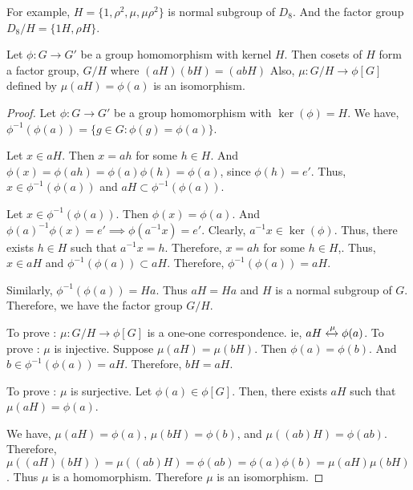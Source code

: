 \begin{remark}
	For example, $H = \{ 1,\rho^2,\mu,\mu\rho^2 \}$ is normal subgroup of $D_8$.
	And the factor group $D_8/H = \{ 1H,\rho H \}$.
\end{remark}

\begin{theorem}
	Let $\phi : G \to G'$ be a group homomorphism with kernel $H$.
	Then cosets of $H$ form a factor group, $G/H$ where $(aH)(bH) = (abH)$ Also, $\mu : G/H \to \phi[G]$ defined by $\mu(aH) = \phi(a)$ is an isomorphism.
\end{theorem}
\begin{proof}
	Let $\phi : G \to G'$ be a group homomorphism with $\ker(\phi) = H$.
	We have, $\phi^{-1}(\phi(a)) = \{ g \in G : \phi(g) = \phi(a) \}$.

	Let $x \in aH$.
	Then $x = ah$ for some $h \in H$.
	And $\phi(x) = \phi(ah) = \phi(a)\phi(h) = \phi(a)$, since $\phi(h) = e'$.
	Thus, $x \in \phi^{-1}(\phi(a))$ and $aH \subset \phi^{-1}(\phi(a))$.

	Let $x \in \phi^{-1}(\phi(a))$.
	Then $\phi(x) = \phi(a)$.
	And $\phi(a)^{-1} \phi(x) = e' \implies \phi(a^{-1}x) = e'$.
	Clearly, $a^{-1}x \in \ker(\phi)$.
	Thus, there exists $h \in H$ such that $a^{-1}x = h$.
	Therefore, $x = ah$ for some $h \in H$,.
	Thus, $x \in aH$ and $\phi^{-1}(\phi(a)) \subset aH$.
	Therefore, $\phi^{-1}(\phi(a)) = aH$.
	
	Similarly, $\phi^{-1}(\phi(a)) = Ha$.
	Thus $aH = Ha$ and $H$ is a normal subgroup of $G$.
	Therefore, we have the factor group $G/H$.

	To prove : $\mu : G/H \to \phi[G]$ is a one-one correspondence.
	ie, $aH \xleftrightarrow{\mu} \phi(a)$.
	To prove : $\mu$ is injective.
	Suppose $\mu(aH) = \mu(bH)$. Then $\phi(a) = \phi(b)$.
	And $b \in \phi^{-1}(\phi(a)) = aH$. Therefore, $bH = aH$.

	To prove : $\mu$ is surjective.
	Let $\phi(a) \in \phi[G]$.
	Then, there exists $aH$ such that  $\mu(aH) = \phi(a)$.

	We have, $\mu(aH) = \phi(a)$, $\mu(bH) = \phi(b)$, and $\mu((ab)H)  = \phi(ab)$.\\
	Therefore, $\mu((aH)(bH)) = \mu((ab)H) = \phi(ab) = \phi(a)\phi(b) = \mu(aH)\mu(bH)$.
	Thus $\mu$ is a homomorphism.
	Therefore $\mu$ is an isomorphism.
\end{proof}

